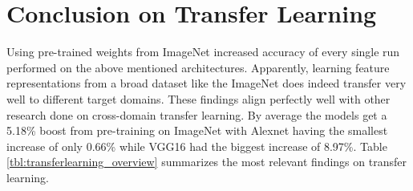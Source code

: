\quad

\section{Conclusion on Transfer Learning}

Using pre-trained weights from ImageNet increased accuracy of every single run performed on the above mentioned architectures. Apparently, learning feature representations from a broad dataset like the ImageNet does indeed transfer very well to different target domains. These findings align perfectly well with other research done on cross-domain transfer learning. By average the models get a 5.18\% boost from pre-training on ImageNet with Alexnet having the smallest increase of only 0.66\% while VGG16 had the biggest increase of 8.97\%. Table \ref{tbl:transferlearning_overview} summarizes the most relevant findings on transfer learning.

\begin{table}[!h] \centering
{}
\caption{Summary of transfer learning results. Only relevant results are shown that are used in the next chapter.}
\label{tbl:transferlearning_overview}
\end{table}

